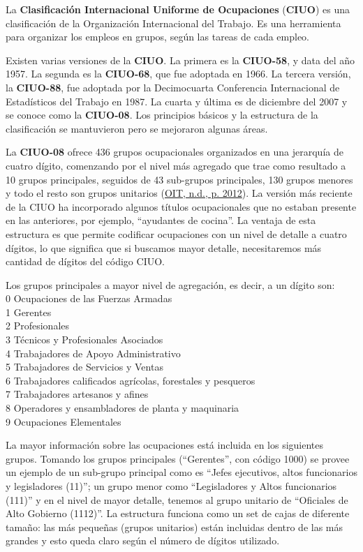 \documentclass[
]{article}
\begin{document}
La \textbf{Clasificación Internacional Uniforme de Ocupaciones} (\textbf{CIUO}) es una clasificación de la Organización Internacional del Trabajo. Es una herramienta para organizar los empleos en grupos, según las tareas de cada empleo.

Existen varias versiones de la \textbf{CIUO}. La primera es la \textbf{CIUO-58}, y data del año 1957. La segunda es la \textbf{CIUO-68}, que fue adoptada en 1966. La tercera versión, la \textbf{CIUO-88}, fue adoptada por la Decimocuarta Conferencia Internacional de Estadísticos del Trabajo en 1987. La cuarta y última es de diciembre del 2007 y se conoce como la \textbf{CIUO-08}. Los principios básicos y la estructura de la clasificación se mantuvieron pero se mejoraron algunas áreas.

La \textbf{CIUO-08} ofrece 436 grupos ocupacionales organizados en una jerarquía de cuatro dígito, comenzando por el nivel más agregado que trae como resultado a 10 grupos principales, seguidos de 43 sub-grupos principales, 130 grupos menores y todo el resto son grupos unitarios (\protect\hyperlink{ref-OIT}{OIT, n.d., p. 2012}). La versión más reciente de la CIUO ha incorporado algunos títulos ocupacionales que no estaban presente en las anteriores, por ejemplo, ``ayudantes de cocina''. La ventaja de esta estructura es que permite codificar ocupaciones con un nivel de detalle a cuatro dígitos, lo que significa que si buscamos mayor detalle, necesitaremos más cantidad de dígitos del código CIUO.

Los grupos principales a mayor nivel de agregación, es decir, a un dígito son:\\
0 Ocupaciones de las Fuerzas Armadas\\
1 Gerentes\\
2 Profesionales\\
3 Técnicos y Profesionales Asociados\\
4 Trabajadores de Apoyo Administrativo\\
5 Trabajadores de Servicios y Ventas\\
6 Trabajadores calificados agrícolas, forestales y pesqueros\\
7 Trabajadores artesanos y afines\\
8 Operadores y ensambladores de planta y maquinaria\\
9 Ocupaciones Elementales

La mayor información sobre las ocupaciones está incluida en los siguientes grupos. Tomando los grupos principales (``Gerentes'', con código 1000) se provee un ejemplo de un sub-grupo principal como es ``Jefes ejecutivos, altos funcionarios y legisladores (11)''; un grupo menor como ``Legisladores y Altos funcionarios (111)'' y en el nivel de mayor detalle, tenemos al grupo unitario de ``Oficiales de Alto Gobierno (1112)''. La estructura funciona como un set de cajas de diferente tamaño: las más pequeñas (grupos unitarios) están incluidas dentro de las más grandes y esto queda claro según el número de dígitos utilizado.
\end{document}
